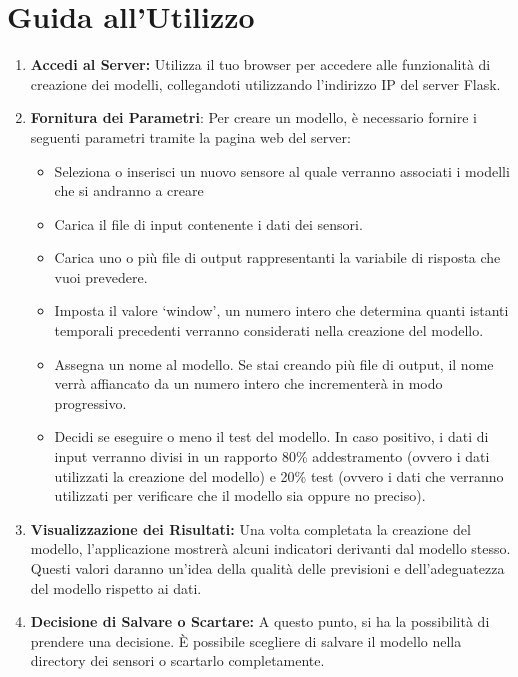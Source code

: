 \documentclass[a4paper,10pt]{article}
\begin{document}
\section{Guida all'Utilizzo}
\begin{enumerate}
  \item \textbf{Accedi al Server:} Utilizza il tuo browser per accedere alle funzionalità di creazione dei modelli, 
  collegandoti utilizzando l'indirizzo IP del server Flask.
  
  \item \textbf{Fornitura dei Parametri}: Per creare un modello, è necessario fornire i seguenti parametri tramite la pagina web del server:
  \begin{itemize}
    \item Seleziona o inserisci un nuovo sensore al quale verranno associati i modelli che si andranno a creare
    \item Carica il file di input contenente i dati dei sensori.
    \item Carica uno o più file di output rappresentanti la variabile di risposta che vuoi prevedere.
    \item Imposta il valore `window', un numero intero che determina quanti istanti temporali precedenti verranno considerati nella creazione del modello.
    \item Assegna un nome al modello. Se stai creando più file di output, il nome verrà affiancato da un numero intero che incrementerà in modo progressivo.
    \item Decidi se eseguire o meno il test del modello. In caso positivo, i dati di input verranno divisi in un rapporto 80\% addestramento (ovvero i dati utilizzati
    la creazione del modello) e 20\% test (ovvero i dati che verranno utilizzati per verificare che il modello sia oppure no preciso).
  \end{itemize}
  
  \item \textbf{Visualizzazione dei Risultati:} Una volta completata la creazione del modello, l'applicazione mostrerà alcuni indicatori derivanti dal modello stesso. 
  Questi valori daranno un'idea della qualità delle previsioni e dell'adeguatezza del modello rispetto ai dati.

  \item \textbf{Decisione di Salvare o Scartare:} A questo punto, si ha la possibilità di prendere una decisione. 
  È possibile scegliere di salvare il modello nella directory dei sensori o scartarlo completamente.
  

\end{enumerate}
\end{document}
